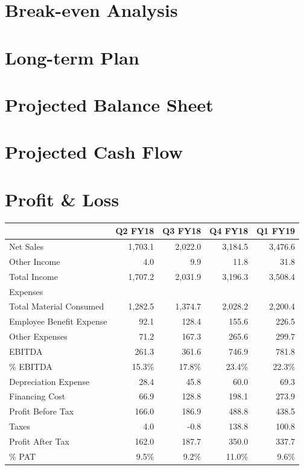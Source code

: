 \documentclass[9pt,]{book}
\begin{document}
\hypertarget{break-even-analysis}{%
\section{Break-even Analysis}\label{break-even-analysis}}

\lipsum[1-3]

\hypertarget{long-term-plan}{%
\section{Long-term Plan}\label{long-term-plan}}

\lipsum[1-3]

\hypertarget{projected-balance-sheet}{%
\section{Projected Balance Sheet}\label{projected-balance-sheet}}

\lipsum[1-3]

\hypertarget{projected-cash-flow}{%
\section{Projected Cash Flow}\label{projected-cash-flow}}

\lipsum[1-3]

\hypertarget{profit-loss}{%
\section{Profit \& Loss}\label{profit-loss}}

\begin{longtable}[]{@{}lrrrr@{}}
\toprule
& Q2 FY18 & Q3 FY18 & Q4 FY18 & Q1 FY19\tabularnewline
\midrule
\endhead
Net Sales & 1,703.1 & 2,022.0 & 3,184.5 & 3,476.6\tabularnewline
Other Income & 4.0 & 9.9 & 11.8 & 31.8\tabularnewline
Total Income & 1,707.2 & 2,031.9 & 3,196.3 & 3,508.4\tabularnewline
Expenses & & & &\tabularnewline
Total Material Consumed & 1,282.5 & 1,374.7 & 2,028.2 &
2,200.4\tabularnewline
Employee Benefit Expense & 92.1 & 128.4 & 155.6 & 226.5\tabularnewline
Other Expenses & 71.2 & 167.3 & 265.6 & 299.7\tabularnewline
EBITDA & 261.3 & 361.6 & 746.9 & 781.8\tabularnewline
\% EBITDA & 15.3\% & 17.8\% & 23.4\% & 22.3\%\tabularnewline
Depreciation Expense & 28.4 & 45.8 & 60.0 & 69.3\tabularnewline
Financing Cost & 66.9 & 128.8 & 198.1 & 273.9\tabularnewline
Profit Before Tax & 166.0 & 186.9 & 488.8 & 438.5\tabularnewline
Taxes & 4.0 & -0.8 & 138.8 & 100.8\tabularnewline
Profit After Tax & 162.0 & 187.7 & 350.0 & 337.7\tabularnewline
\% PAT & 9.5\% & 9.2\% & 11.0\% & 9.6\%\tabularnewline
\bottomrule
\end{longtable}
\end{document}
